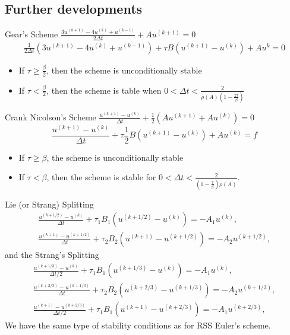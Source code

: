 \documentclass[hyperref={pdfpagemode=FullScreen},9pt]{beamer}
\newcommand{\Frac}[2] {\frac{\textstyle #1} {\textstyle #2}}
\begin{document}
 \subsection{Further developments}
 \begin{frame}
 \begin{block}{Gear's Scheme $\frac{3u^{(k+1)}-4u^{(k)}+u^{(k-1)}}{2\Delta t}+Au^{(k+1)}=0$}
 \begin{eqnarray*}\label{RSS_GEAR}
\Frac{1}{2\Delta t}(3u^{(k+1)}-4u^{(k)}+u^{(k-1)})
+\tau B(u^{(k+1)}-u^{(k)})+Au^k=0
\end{eqnarray*}
\begin{itemize}
\item If $\tau\ge \Frac{\beta}{2}$, then  the scheme is unconditionally stable
\item If $\tau < \Frac{\beta}{2}$, then the scheme is table when
$
0<\Delta t < \Frac{2}{\rho(A)(1-\Frac{2\tau}{\beta})}
$
\end{itemize}
 \end{block}
 \begin{block}{Crank Nicolson's Scheme $\frac{u^{(k+1)}-u^{(k)}}{\Delta t}+\frac{1}{2}(Au^{(k+1)}+Au^{(k)})=0$}
 $$
\Frac{u^{(k+1)}-u^{(k)}}{\Delta t}
+\tau \Frac{1}{2} B(u^{(k+1)}-u^{(k)})
+Au^{(k)}=f
$$
 \begin{itemize}
\item If $\tau\ge \beta$, the scheme is unconditionally stable %
\item If $\tau < \beta$, then the scheme is stable for
$
0<\Delta t < \Frac{2}{\left(1-\Frac{\tau}{\beta}\right)\rho(A)}.
$
\end{itemize}
 \end{block}
 \end{frame}
 \begin{frame}
 \begin{block}{Lie (or Strang) Splitting}
 \begin{eqnarray}
\Frac{u^{(k+1/2)}-u^{(k)}}{\Delta t} +\tau_1 B_1 (u^{(k+1/2)}-u^{(k)}) = -A_1 u^{(k)},\\
\Frac{u^{(k+1)}-u^{(k+1/2)}}{\Delta t} +\tau_2 B_2 (u^{(k+1)}-u^{(k+1/2)}) = -A_2 u^{(k+1/2)},
\label{RSS_ADI1}
\end{eqnarray}
and the Strang's Splitting
\begin{eqnarray}
\Frac{u^{(k+1/3)}-u^{(k)}}{\Delta t/2} +\tau_1 B_1 (u^{(k+1/3)}-u^{(k)}) = -A_1 u^{(k)},\\
\Frac{u^{(k+2/3)}-u^{(k+1/3)}}{\Delta t} +\tau_2 B_2 (u^{(k+2/3)}-u^{(k+1/3)}) = -A_2 u^{(k+1/3)},\\
\Frac{u^{(k+1)}-u^{(k+2/3)}}{\Delta t/2} +\tau_1 B_1 (u^{(k+1)}-u^{(k+2/3)}) = -A_1 u^{(k+2/3)},
\label{RSS_ADI2}
\end{eqnarray}
We have the same type of stability conditions as for RSS Euler's scheme.
 \end{block}
 \end{frame}
\end{document}
